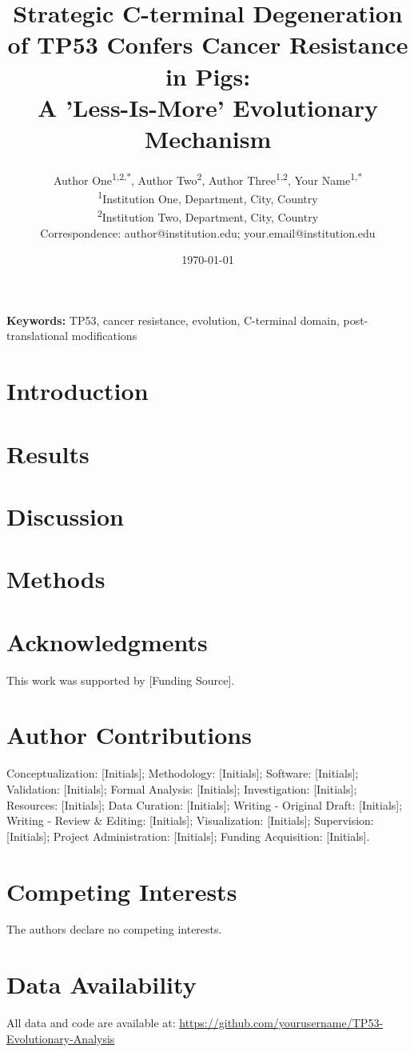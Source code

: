 \documentclass[12pt,a4paper]{article}
\title{Strategic C-terminal Degeneration of TP53 Confers Cancer Resistance in Pigs:\\ A 'Less-Is-More' Evolutionary Mechanism}
\author{
    Author One\textsuperscript{1,2,*},
    Author Two\textsuperscript{2},
    Author Three\textsuperscript{1,2},
    Your Name\textsuperscript{1,*}
    \\
    \small \textsuperscript{1}Institution One, Department, City, Country
    \\
    \small \textsuperscript{2}Institution Two, Department, City, Country
    \\
    \small *Correspondence: author@institution.edu; your.email@institution.edu
}
\date{\today}
\begin{document}
\maketitle

\begin{abstract}
    
\end{abstract}

\textbf{Keywords:} TP53, cancer resistance, evolution, C-terminal domain, post-translational modifications

\section{Introduction}
\label{sec:introduction}


\section{Results}
\label{sec:results}


\section{Discussion}
\label{sec:discussion}


\section{Methods}
\label{sec:methods}


\section*{Acknowledgments}
This work was supported by [Funding Source].

\section*{Author Contributions}
Conceptualization: [Initials]; Methodology: [Initials]; Software: [Initials]; Validation: [Initials]; Formal Analysis: [Initials]; Investigation: [Initials]; Resources: [Initials]; Data Curation: [Initials]; Writing - Original Draft: [Initials]; Writing - Review \& Editing: [Initials]; Visualization: [Initials]; Supervision: [Initials]; Project Administration: [Initials]; Funding Acquisition: [Initials].

\section*{Competing Interests}
The authors declare no competing interests.

\section*{Data Availability}
All data and code are available at: \url{https://github.com/yourusername/TP53-Evolutionary-Analysis}



\end{document}
